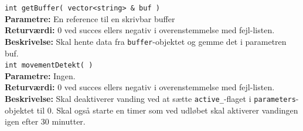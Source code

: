 \verb+int getBuffer( vector<string> & buf )+ \\
\textbf{Parametre:} En reference til en skrivbar buffer \\
\textbf{Returværdi:} 0 ved succes ellers negativ i overenstemmelse med fejl-listen. \\
\textbf{Beskrivelse:} Skal hente data fra \verb+buffer+-objektet og gemme det i parametren buf.\\

\verb+int movementDetekt( )+ \\
\textbf{Parametre:} Ingen. \\
\textbf{Returværdi:} 0 ved succes ellers negativ i overenstemmelse med fejl-listen. \\
\textbf{Beskrivelse:} Skal deaktiverer vanding ved at sætte \verb+active_+-flaget i \verb+parameters+-objektet til 0. Skal også starte en timer som ved udløbet skal aktiverer vandingen igen efter 30 minutter.\\